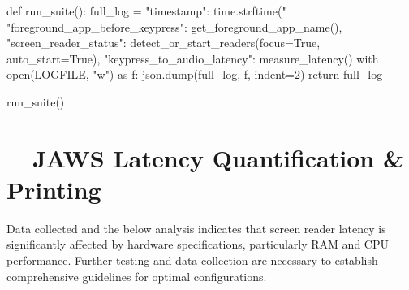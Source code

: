 \begin{pyverbatim}
	def run_suite():
	full_log = {
	"timestamp": time.strftime("%
	"foreground_app_before_keypress": get_foreground_app_name(),
	"screen_reader_status": detect_or_start_readers(focus=True, auto_start=True),
	"keypress_to_audio_latency": measure_latency()
	}
	with open(LOGFILE, "w") as f:
	json.dump(full_log, f, indent=2)
	return full_log

	run_suite()
\end{pyverbatim}

\section{~~JAWS Latency Quantification \& Printing}
Data collected and the below analysis indicates that screen reader latency is significantly affected by hardware specifications, particularly RAM and CPU performance. Further testing and data collection are necessary to establish comprehensive guidelines for optimal configurations.

